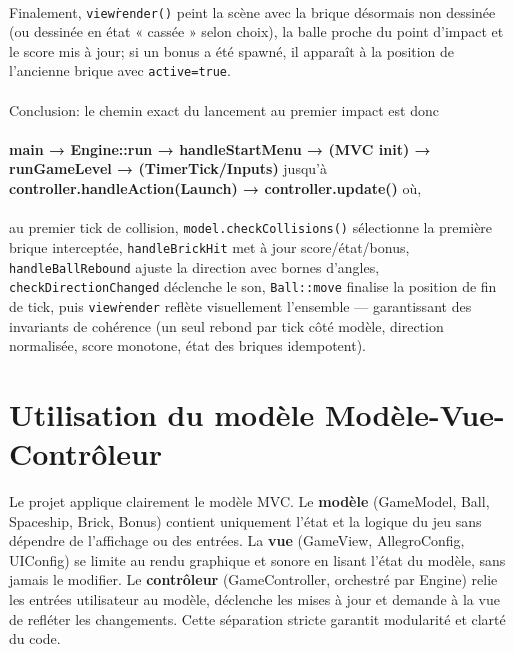 \documentclass[12pt]{article}
\begin{document}
\paragraph{}

Finalement, \colorbox{gray!20}{\texttt{view\.render()}} peint la scène avec la brique désormais non dessinée (ou dessinée en état « cassée » selon choix), la balle proche du point d’impact et le score mis à jour; si un bonus a été spawné, il apparaît à la position de l’ancienne brique avec \texttt{active=true}.

\paragraph{}
Conclusion: le chemin exact du lancement au premier impact est donc 

\paragraph{}

\textbf{main → Engine::run → handleStartMenu → (MVC init) → runGameLevel → (TimerTick/Inputs)} jusqu’à \textbf{controller.handleAction(Launch) → controller.update()} où, 

\paragraph{}
au premier tick de collision, \colorbox{gray!20}{\texttt{model.checkCollisions()}} sélectionne la première brique interceptée, \colorbox{gray!20}{\texttt{handleBrickHit}} met à jour score/état/bonus, \colorbox{gray!20}{\texttt{handleBallRebound}} ajuste la direction avec bornes d’angles, \colorbox{gray!20}{\texttt{checkDirectionChanged}} déclenche le son, \colorbox{gray!20}{\texttt{Ball::move}} finalise la position de fin de tick, puis \colorbox{gray!20}{\texttt{view\.render}} reflète visuellement l’ensemble — garantissant des invariants de cohérence (un seul rebond par tick côté modèle, direction normalisée, score monotone, état des briques idempotent).



\section{Utilisation du modèle Modèle-Vue-Contrôleur}

Le projet applique clairement le modèle MVC. Le \textbf{modèle} (GameModel, Ball, Spaceship, Brick, Bonus) contient uniquement l’état et la logique du jeu sans dépendre de l’affichage ou des entrées. La \textbf{vue} (GameView, AllegroConfig, UIConfig) se limite au rendu graphique et sonore en lisant l’état du modèle, sans jamais le modifier. Le \textbf{contrôleur} (GameController, orchestré par Engine) relie les entrées utilisateur au modèle, déclenche les mises à jour et demande à la vue de refléter les changements. Cette séparation stricte garantit modularité et clarté du code.
\end{document}
